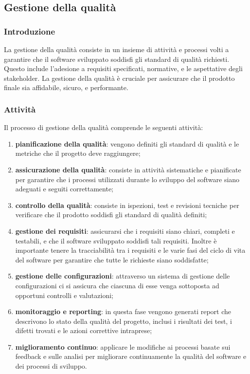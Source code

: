 \subsection{Gestione della qualità}
\subsubsection{Introduzione}
La gestione della qualità consiste in un insieme di attività e processi volti a garantire che il software sviluppato soddisfi gli standard di qualità richiesti. Questo include l'adesione a requisiti specificati, normative, e le aspettative degli stakeholder. La gestione della qualità è cruciale per assicurare che il prodotto finale sia affidabile, sicuro, e performante.

\subsubsection{Attività}
Il processo di gestione della qualità comprende le seguenti attività:
\begin{enumerate}
	\item \textbf{pianificazione della qualità}: vengono definiti gli standard di qualità e le metriche che il progetto deve raggiungere;
	\item \textbf{assicurazione della qualità}: consiste in attività sistematiche e pianificate per garantire che i processi utilizzati durante lo sviluppo del software siano adeguati e seguiti correttamente;
	\item \textbf{controllo della qualità}: consiste in ispezioni, test e revisioni tecniche per verificare che il prodotto soddisfi gli standard di qualità definiti;
	\item \textbf{gestione dei requisiti}: assicurarsi che i requisiti siano chiari, completi e testabili, e che il software sviluppato soddisfi tali requisiti. Inoltre è importante tenere la tracciabilità tra i requisiti e le varie fasi del ciclo di vita del software per garantire che tutte le richieste siano soddisfatte;
	\item \textbf{gestione delle configurazioni}: attraverso un sistema di gestione delle configurazioni ci si assicura che ciascuna di esse venga sottoposta ad opportuni controlli e valutazioni;
	\item \textbf{monitoraggio e reporting}: in questa fase vengono generati report che descrivono lo stato della qualità del progetto, inclusi i risultati dei test, i difetti trovati e le azioni correttive intraprese;
	\item \textbf{miglioramento continuo}: applicare le modifiche ai processi basate sui feedback e sulle analisi per migliorare continuamente la qualità del software e dei processi di sviluppo.
\end{enumerate}

